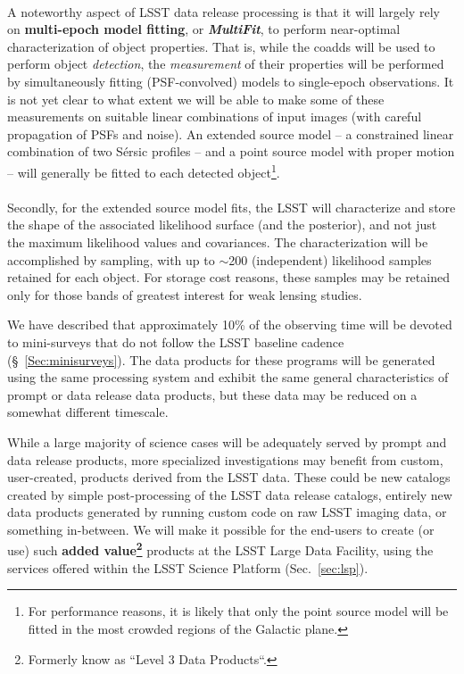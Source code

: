 \begin{itemize}
\\
A noteworthy aspect of LSST data release processing is that it will largely
rely on {\bf multi-epoch model fitting}, or {\bf \em MultiFit}, to
perform near-optimal characterization of object properties. That is,
while the coadds will be used to perform object {\em detection}, the
{\em measurement} of their properties will be performed by
simultaneously fitting (PSF-convolved) models to single-epoch
observations. It is not yet clear to what extent we will be able to make some of these
measurements on suitable linear combinations of input images (with careful propagation
of PSFs and noise).
An extended source model -- a constrained linear
combination of two S\'ersic profiles -- and a point source model with
proper motion -- will generally be
fitted to each detected object\footnote{For performance reasons, it is
  likely that only the point source model will be fitted in the most
  crowded regions of the Galactic plane.}.\\
\\
Secondly, for the extended source model fits, the LSST will
characterize and store the shape of the associated likelihood surface
(and the posterior), and not just the maximum likelihood values and
covariances. The characterization will be accomplished by sampling,
with up to $\sim$200 (independent) likelihood samples retained for
each object. For storage cost reasons, these samples
may be retained only for those bands of greatest interest for
weak lensing studies.

\end{itemize}

We have described that approximately 10\% of the observing time will
be devoted to mini-surveys that do not follow the LSST baseline
cadence (\S~\ref{Sec:minisurveys}). The data products for these
programs will be generated using the same processing system and
exhibit the same general characteristics of prompt or data release   data
products, but these data may be reduced on a somewhat different
timescale.

While a large majority of science cases will be adequately served by prompt
and data release products, more specialized investigations may benefit from
custom, user-created, products derived from the LSST data.  These could be
new catalogs created by simple post-processing of the LSST data release
catalogs, entirely new data products generated by running custom code on raw
LSST imaging data, or something in-between.  We will make it possible for the
end-users to create (or use) such {\bf added value\footnote{Formerly know as
``Level 3 Data Products``.}} products at the LSST Large Data Facility,
using the services offered within the LSST Science Platform (Sec.~\ref{sec:lsp}).


